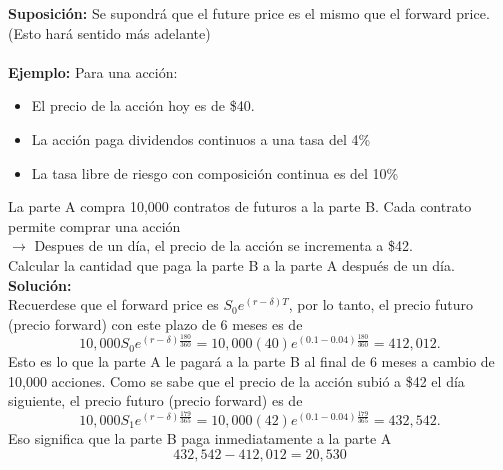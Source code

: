\documentclass[12pts]{extarticle}
\begin{document}
\textbf{Suposición:} Se supondrá que el future price es el mismo que el forward price. (Esto hará sentido más adelante)
\\ \\ 
\textbf{Ejemplo:} Para una acción:
\begin{itemize}
\item El precio de la acción hoy es de \$40.
\item La acción paga dividendos continuos a una tasa del 4\%
\item La tasa libre de riesgo con composición continua es del 10\%
\end{itemize} 
La parte A compra 10,000 contratos de futuros a la parte B. Cada contrato permite comprar una acción \\
$\rightarrow$ Despues de un día, el precio de la acción se incrementa a \$42. \\
Calcular la cantidad que paga la parte B a la parte A después de un día. 
\\ 
\textbf{Solución:} 
\\ 
Recuerdese que el forward price es $S_0 e^{(r-\delta)T}$, por lo tanto, el precio futuro (precio forward) con este plazo de 6 meses es de 
$$10,000S_0 e^{(r-\delta)\frac{180}{360}} =10,000(40)e^{(0.1-0.04)\frac{180}{360}}=412,012.$$
Esto es lo que la parte A le pagará a la parte B al final de 6 meses a cambio de 10,000 acciones. Como se sabe que el precio de la acción subió a \$42 el día siguiente, el precio futuro (precio forward) es de 
$$10,000S_1 e ^{(r-\delta)\frac{179}{365}}=10,000(42)e^{(0.1-0.04)\frac{179}{365}}=432,542.$$
Eso significa que la parte B paga inmediatamente a la parte A 
$$432,542-412,012=20,530$$
\end{document}
